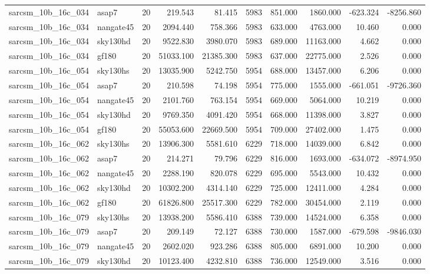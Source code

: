 \begin{longtable}{llrrrrrrrr}
sarcsm\_10b\_16c\_034 & asap7 & 20 & 219.543 & 81.415 & 5983 & 851.000 & 1860.000 & -623.324 & -8256.860 \\
sarcsm\_10b\_16c\_034 & nangate45 & 20 & 2094.440 & 758.366 & 5983 & 633.000 & 4763.000 & 10.460 & 0.000 \\
sarcsm\_10b\_16c\_034 & sky130hd & 20 & 9522.830 & 3980.070 & 5983 & 689.000 & 11163.000 & 4.662 & 0.000 \\
sarcsm\_10b\_16c\_034 & gf180 & 20 & 51033.100 & 21385.300 & 5983 & 637.000 & 22775.000 & 2.526 & 0.000 \\
sarcsm\_10b\_16c\_054 & sky130hs & 20 & 13035.900 & 5242.750 & 5954 & 688.000 & 13457.000 & 6.206 & 0.000 \\
sarcsm\_10b\_16c\_054 & asap7 & 20 & 210.598 & 74.198 & 5954 & 775.000 & 1555.000 & -661.051 & -9726.360 \\
sarcsm\_10b\_16c\_054 & nangate45 & 20 & 2101.760 & 763.154 & 5954 & 669.000 & 5064.000 & 10.219 & 0.000 \\
sarcsm\_10b\_16c\_054 & sky130hd & 20 & 9769.350 & 4091.420 & 5954 & 668.000 & 11398.000 & 3.827 & 0.000 \\
sarcsm\_10b\_16c\_054 & gf180 & 20 & 55053.600 & 22669.500 & 5954 & 709.000 & 27402.000 & 1.475 & 0.000 \\
sarcsm\_10b\_16c\_062 & sky130hs & 20 & 13906.300 & 5581.610 & 6229 & 718.000 & 14039.000 & 6.842 & 0.000 \\
sarcsm\_10b\_16c\_062 & asap7 & 20 & 214.271 & 79.796 & 6229 & 816.000 & 1693.000 & -634.072 & -8974.950 \\
sarcsm\_10b\_16c\_062 & nangate45 & 20 & 2288.190 & 820.078 & 6229 & 695.000 & 5543.000 & 10.432 & 0.000 \\
sarcsm\_10b\_16c\_062 & sky130hd & 20 & 10302.200 & 4314.140 & 6229 & 725.000 & 12411.000 & 4.284 & 0.000 \\
sarcsm\_10b\_16c\_062 & gf180 & 20 & 61826.800 & 25517.300 & 6229 & 782.000 & 30454.000 & 2.119 & 0.000 \\
sarcsm\_10b\_16c\_079 & sky130hs & 20 & 13938.200 & 5586.410 & 6388 & 739.000 & 14524.000 & 6.358 & 0.000 \\
sarcsm\_10b\_16c\_079 & asap7 & 20 & 209.149 & 72.127 & 6388 & 730.000 & 1587.000 & -679.598 & -9846.030 \\
sarcsm\_10b\_16c\_079 & nangate45 & 20 & 2602.020 & 923.286 & 6388 & 805.000 & 6891.000 & 10.200 & 0.000 \\
sarcsm\_10b\_16c\_079 & sky130hd & 20 & 10123.400 & 4232.810 & 6388 & 736.000 & 12549.000 & 3.516 & 0.000 \\

\end{longtable}
